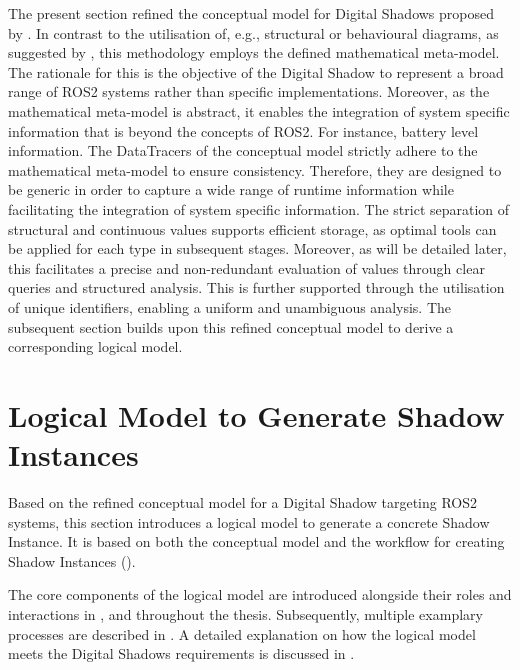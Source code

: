     The present section refined the conceptual model for Digital Shadows proposed by \Textcite{DSConceptualModelSpringer}.
    In contrast to the utilisation of, e.g., structural or behavioural diagrams, as suggested by \Textcite{DSConceptualModelSpringer}, this methodology employs the defined mathematical meta-model. The rationale for this is the objective of the Digital Shadow to represent a broad range of ROS2 systems rather than specific implementations. Moreover, as the mathematical meta-model is abstract, it enables the integration of system specific information that is beyond the concepts of ROS2. For instance, battery level information.\newline
    The DataTracers of the conceptual model strictly adhere to the mathematical meta-model to ensure consistency. Therefore, they are designed to be generic in order to capture a wide range of runtime information while facilitating the integration of system specific information. The strict separation of structural and continuous values supports efficient storage, as optimal tools can be applied for each type in subsequent stages. Moreover, as will be detailed later, this facilitates a precise and non-redundant evaluation of values through clear queries and structured analysis. This is further supported through the utilisation of unique identifiers, enabling a uniform and unambiguous analysis.\newline
    The subsequent section builds upon this refined conceptual model to derive a corresponding logical model.


    \section{Logical Model to Generate Shadow Instances} \label{sec:dshadow:logicalmodel}
    Based on the refined conceptual model for a Digital Shadow targeting ROS2 systems, this section introduces a logical model to generate a concrete Shadow Instance. It is based on both the conceptual model and the workflow for creating Shadow Instances ().

    The core components of the logical model are introduced alongside their roles and interactions in , and  throughout the thesis. Subsequently, multiple examplary processes are described in . A detailed explanation on how the logical model meets the Digital Shadows requirements is discussed in .

